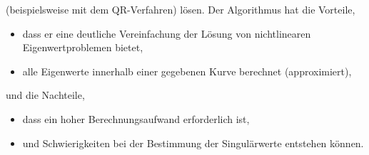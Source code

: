 (beispielsweise mit dem QR-Verfahren) lösen.
Der Algorithmus hat die Vorteile,

\begin{itemize}
    \item dass er eine deutliche Vereinfachung der Lösung von nichtlinearen Eigenwertproblemen bietet,
    \item alle Eigenwerte innerhalb einer gegebenen Kurve berechnet (approximiert),
\end{itemize}

und die Nachteile,

\begin{itemize}
    \item dass ein hoher Berechnungsaufwand erforderlich ist,
    \item und Schwierigkeiten bei der Bestimmung der  Singulärwerte entstehen können.
\end{itemize}
